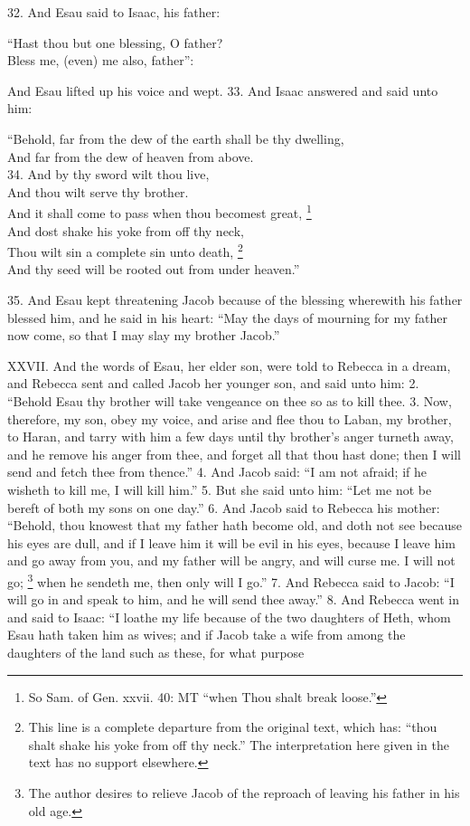 32. And Esau said to Isaac, his father:

``Hast thou but one blessing, O father?\\
Bless me, (even) me also, father'':

And Esau lifted up his voice and wept. 33. And Isaac answered and said unto him:

``Behold, far from the dew of the earth shall be thy dwelling,\\
And far from the dew of heaven from above.\\
34. And by thy sword wilt thou live,\\
And thou wilt serve thy brother.\\
And it shall come to pass when thou becomest great, \footnote{So Sam. of Gen. xxvii. 40: MT ``when Thou shalt break loose.''}\\
And dost shake his yoke from off thy neck,\\
Thou wilt sin a complete sin unto death, \footnote{This line is a complete departure from the original text, which has: ``thou shalt shake his yoke from off thy neck.'' The interpretation here given in the text has no support elsewhere.}\\
And thy seed will be rooted out from under heaven.''

35. And Esau kept threatening Jacob because of the blessing wherewith his father blessed him, and he said in his heart: ``May the days of mourning for my father now come, so that I may slay my brother Jacob.''


XXVII. And the words of Esau, her elder son, were told to Rebecca in a dream, and Rebecca sent and called Jacob her younger son, and said unto him: 2. ``Behold Esau thy brother will take vengeance on thee so as to kill thee. 3. Now, therefore, my son, obey my voice, and arise and flee thou to Laban, my brother, to Haran, and tarry with him a few days until thy brother's anger turneth away, and he remove his anger from thee, and forget all that thou hast done; then I will send and fetch thee from thence.'' 4. And Jacob said: ``I am not afraid; if he wisheth to kill me, I will kill him.'' 5. But she said unto him: ``Let me not be bereft of both my sons on one day.'' 6. And Jacob said to Rebecca his mother: ``Behold, thou knowest that my father hath become old, and doth not see because his eyes are dull, and if I leave him it will be evil in his eyes, because I leave him and go away from you, and my father will be angry, and will curse me. I will not go; \footnote{The author desires to relieve Jacob of the reproach of leaving his father in his old age.} when he sendeth me, then only will I go.'' 7. And Rebecca said to Jacob: ``I will go in and speak to him, and he will send thee away.'' 8. And Rebecca went in and said to Isaac: ``I loathe my life because of the two daughters of Heth, whom Esau hath taken him as wives; and if Jacob take a wife from among the daughters of the land such as these, for what purpose

